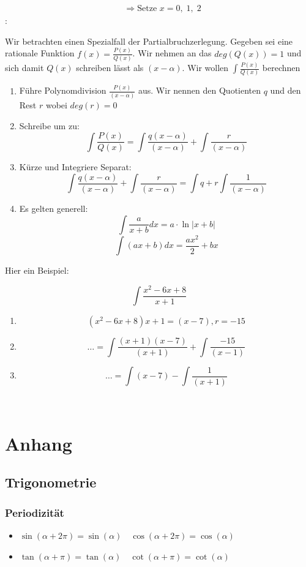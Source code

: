 \documentclass[7pt,landscape, margin = 0.1mm]{article}
\newcommand{\KRZ}[2]{\vspace{1mm} \hline \vspace{1mm} \color{chaptercolor}{RC #1}:\color{black} \   \hspace{0.2cm}\vspace{1mm}   {\begin{minipage}{20em}
#2 \end{minipage}} \vspace{1mm}  \hline \vspace{1mm}  \\}
\begin{document}
\begin{multicols}{4}
{\begin{align*}
  &\Rightarrow \text{Setze } x = 0,\;1,\;2
\end{align*}}
\KRZ{Rationale Funktionen Integrieren}{
Wir betrachten einen Spezialfall der Partialbruchzerlegung.
Gegeben sei eine rationale Funktion $f(x)=\frac{P(x)}{Q(x)}$. Wir nehmen an das $deg(Q(x))=1$ und sich damit $Q(x)$ schreiben lässt als $(x - \alpha)$. Wir wollen $\int \frac{P(x)}{Q(x)}$ berechnen
\begin{enumerate}
\item Führe Polynomdivision $\frac{P(x)}{(x- \alpha)}$ aus. Wir nennen den Quotienten $q$ und den Rest $r$ wobei $deg(r)=0$
\item Schreibe um zu: $$\int\frac{P(x)}{Q(x)} = \int \frac{q (x-\alpha)}{(x-\alpha)}+ \int \frac{r}{(x-\alpha)}$$
\item Kürze und Integriere Separat: $$ \int \frac{q (x-\alpha)}{(x-\alpha)}+ \int \frac{r}{(x-\alpha)}= \int q  + r \int \frac{1}{(x-\alpha)}$$
 \item Es gelten generell: $$\int \frac{a}{x+b} dx = a \cdot \ln |x+b| $$ $$  \int (ax + b) dx = \frac{ax^2}{2	}+bx$$
\end{enumerate}
Hier ein Beispiel:

$$\int \frac{x^2-6x+8}{x+1}$$
\begin{enumerate}
\item $$(x^2-6x+8){x+1} = (x-7), r = -15$$
\item $$ \ldots = \int \frac{(x+1)(x-7)}{(x+1)} + \int \frac{-15}{(x-1)}$$
\item $$\ldots= \int (x-7) - \int \frac{1}{(x+1)}$$
\end{enumerate}
}


\section{Anhang}
\subsection{Trigonometrie}
\vspace{1mm} \hline \vspace{3 mm}
\subsubsection{Periodizität}
\begin{itemize}
 \item $\sin(\alpha + 2 \pi) = \sin(\alpha) \quad \cos(\alpha + 2 \pi) = \cos(\alpha)$
 \item $\tan(\alpha + \pi) = \tan(\alpha) \quad \cot(\alpha + \pi) = \cot(\alpha)$


\end{itemize}
\end{multicols}
\end{document}
